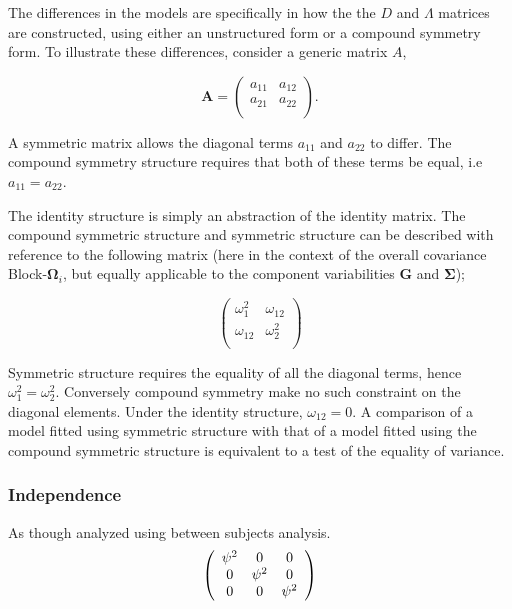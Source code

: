 \documentclass[12pt, a4paper]{report}
\theoremstyle{plain}
\theoremstyle{definition}
\theoremstyle{remark}
\begin{document}
	The differences in the models are specifically in how the the $D$ and $\Lambda$ matrices are constructed, using either an unstructured form or a compound symmetry form. To illustrate these differences, consider a generic matrix $A$,
	
	\[
	\boldsymbol{A} = \left( \begin{array}{cc}
	a_{11} & a_{12}  \\
	a_{21} & a_{22}  \\
	\end{array}\right).
	\]
	
	A symmetric matrix allows the diagonal terms $a_{11}$ and $a_{22}$ to differ. The compound symmetry structure requires that both of these terms be equal, i.e $a_{11} = a_{22}$.
	
	
	The identity structure is simply an abstraction of the identity matrix. The compound symmetric structure and symmetric structure can be described with reference to the following matrix (here in the context of the overall covariance Block-$\boldsymbol{\Omega}_i$, but equally applicable to the component variabilities $\boldsymbol{G}$ and $\boldsymbol{\Sigma}$);
	
	\[\left( \begin{array}{cc}
	\omega^2_1  & \omega_{12} \\
	\omega_{12} & \omega^2_2 \\
	\end{array}\right) \]
	
	Symmetric structure requires the equality of all the diagonal terms, hence $\omega^2_1 = \omega^2_2$. Conversely compound symmetry make no such constraint on the diagonal elements. Under the identity structure, $\omega_{12} = 0$.
	A comparison of a model fitted using symmetric structure with that of a model fitted using the compound symmetric structure is equivalent to a test of the equality of variance.
	
	
	
	
	
	\subsubsection{Independence}
	
	As though analyzed using between subjects analysis.
	\[
	\left(
	\begin{array}{c c c}
	\psi^2 & 0 & 0   \\
	0 & \psi^2 & 0   \\
	0 & 0 & \psi^2   \\
	\end{array}%
	\right)
	\]
	
\end{document}
